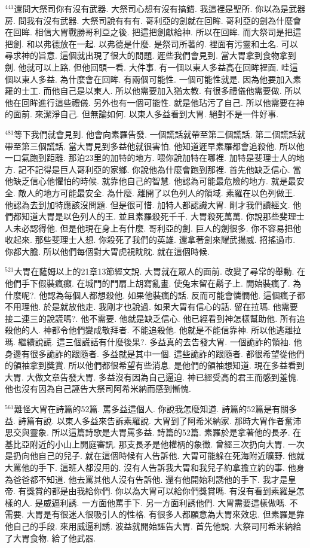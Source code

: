 \documentclass{book}
\begin{document}
$^{441}$還問大祭司你有沒有武器.
大祭司心想有沒有搞錯.
我這裡是聖所.
你以為是武器房.
問我有沒有武器.
大祭司說有有有.
哥利亞的劍就在回眸.
哥利亞的劍為什麼會在回眸.
相信大胃戰勝哥利亞之後.
把這把劍獻給神.
所以在回眸.
而大祭司是把這把劍.
和以弗德放在一起.
以弗德是什麼.
是祭司所著的.
裡面有污靈和土名.
可以尋求神的旨意.
這個就出現了很大的問題.
遲些我們會見到.
當大胃拿到食物拿到劍.
他就可以上路.
但他回頭一看.
大件事.
有一個以東人多益高在回眸裡面.
哇這個以東人多益.
為什麼會在回眸.
有兩個可能性.
一個可能性就是.
因為他要加入素羅的士工.
而他自己是以東人.
所以他需要加入猶太教.
有很多禮儀他需要做.
所以他在回眸進行這些禮儀.
另外也有一個可能性.
就是他玷污了自己.
所以他需要在神的面前.
來潔淨自己.
但無論如何.
以東人多益看到大胃.
絕對不是一件好事.

$^{481}$等下我們就會見到.
他會向素羅告發.
一個謊話就帶至第二個謊話.
第二個謊話就帶至第三個謊話.
當大胃見到多益他就很害怕.
他知道遲早素羅都會追殺他.
所以他一口氣跑到距離.
那泊23里的加特的地方.
喂你說加特在哪裡.
加特是斐理士人的地方.
記不記得是巨人哥利亞的家鄉.
你說他為什麼會跑到那裡.
首先他缺乏信心.
當他缺乏信心他懼怕的時候.
就靠他自己的智慧.
他認為可能最危險的地方.
就是最安全.
敵人的地方可能最安全.
為什麼.
離開了以色列人的領域.
素羅在以色列做王.
他認為去到加特應該沒問題.
但是很可惜.
加特人都認識大胃.
剛才我們讀經文.
他們都知道大胃是以色列人的王.
並且素羅殺死千千.
大胃殺死萬萬.
你說那些斐理士人未必認得他.
但是他現在身上有什麼.
哥利亞的劍.
巨人的劍很多.
你不容易把他收起來.
那些斐理士人想.
你殺死了我們的英雄.
還拿著劍來耀武揚威.
招搖過市.
你都大膽.
所以他們每個對大胃虎視眈眈.
就在這個時候.

$^{521}$大胃在薩姆以上的21章13節經文說.
大胃就在眾人的面前.
改變了尋常的舉動.
在他們手下假裝瘋癲.
在城門的門扇上胡寫亂畫.
使兔末留在鬍子上.
開始裝瘋了.
為什麼呢?.
他認為每個人都想殺他.
如果他裝瘋的話.
反而可能會憐憫他.
這個瘋子都不用理他.
於是就放他走.
我剛才也說過.
如果大胃有信心的話.
留在拉瑪.
他需要接二連三的說謊嗎?.
他不需要.
他就是缺乏信心.
他已經看到神怎樣幫助他.
所有追殺他的人.
神都令他們變成敬拜者.
不能追殺他.
他就是不能信靠神.
所以他逃離拉瑪.
繼續說謊.
這三個謊話有什麼後果?.
多益真的去告發大胃.
一個詭詐的領袖.
他身邊有很多詭詐的跟隨者.
多益就是其中一個.
這些詭詐的跟隨者.
都很希望從他們的領袖拿到獎賞.
所以他們都很希望有些消息.
是他們的領袖想知道.
現在多益看到大胃.
大做文章告發大胃.
多益沒有因為自己逼迫.
神已經受高的君王而感到羞愧.
他也沒有因為自己誣告大祭司阿希米納而感到慚愧.

$^{561}$難怪大胃在詩篇的52篇.
罵多益這個人.
你說我怎麼知道.
詩篇的52篇是有關多益.
詩篇有說.
以東人多益來告訴素羅說.
大胃到了阿希米納家.
那時大胃作者奮沛思交與靈象.
所以這篇詩歌是大胃罵多益.
詩篇的52篇.
素羅於是拿著他的長矛.
在基比亞附近的小山上開庭審訊.
那支長矛是他權柄的象徵.
曾經三次扔向大胃.
一次是扔向他自己的兒子.
就在這個時候有人告訴他.
大胃可能躲在死海附近曠野.
他就大罵他的手下.
這班人都沒用的.
沒有人告訴我大胃和我兒子約拿擔立約的事.
他身為爸爸都不知道.
他去罵其他人沒有告訴他.
還有他開始利誘他的手下.
我才是皇帝.
有獎賞的都是由我給你們.
你以為大胃可以給你們獎賞嗎.
有沒有看到素羅是怎樣的人.
是威逼利誘.
一方面他罵手下.
另一方面利誘他們.
大胃需要這樣做嗎.
不需要.
大胃是有很迷人很吸引人的性格.
有很多人都願意為大胃來效忠.
但素羅是靠他自己的手段.
來用威逼利誘.
波益就開始誣告大胃.
首先他說.
大祭司阿希米納給了大胃食物.
給了他武器.
\end{document}
